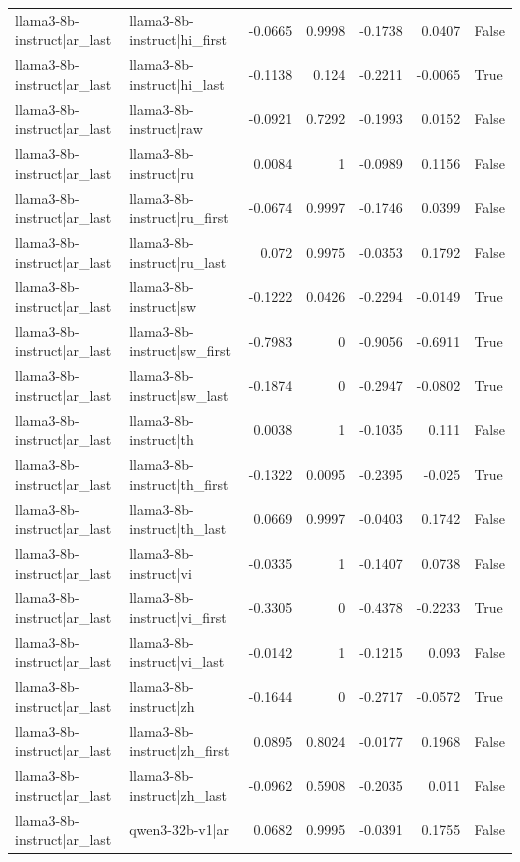 \begin{table}
\begin{tabular}{l l r r r r l}
llama3-8b-instruct|ar_last & llama3-8b-instruct|hi_first & -0.0665 & 0.9998 & -0.1738 & 0.0407 & False \\
llama3-8b-instruct|ar_last & llama3-8b-instruct|hi_last & -0.1138 & 0.124 & -0.2211 & -0.0065 & True \\
llama3-8b-instruct|ar_last & llama3-8b-instruct|raw & -0.0921 & 0.7292 & -0.1993 & 0.0152 & False \\
llama3-8b-instruct|ar_last & llama3-8b-instruct|ru & 0.0084 & 1 & -0.0989 & 0.1156 & False \\
llama3-8b-instruct|ar_last & llama3-8b-instruct|ru_first & -0.0674 & 0.9997 & -0.1746 & 0.0399 & False \\
llama3-8b-instruct|ar_last & llama3-8b-instruct|ru_last & 0.072 & 0.9975 & -0.0353 & 0.1792 & False \\
llama3-8b-instruct|ar_last & llama3-8b-instruct|sw & -0.1222 & 0.0426 & -0.2294 & -0.0149 & True \\
llama3-8b-instruct|ar_last & llama3-8b-instruct|sw_first & -0.7983 & 0 & -0.9056 & -0.6911 & True \\
llama3-8b-instruct|ar_last & llama3-8b-instruct|sw_last & -0.1874 & 0 & -0.2947 & -0.0802 & True \\
llama3-8b-instruct|ar_last & llama3-8b-instruct|th & 0.0038 & 1 & -0.1035 & 0.111 & False \\
llama3-8b-instruct|ar_last & llama3-8b-instruct|th_first & -0.1322 & 0.0095 & -0.2395 & -0.025 & True \\
llama3-8b-instruct|ar_last & llama3-8b-instruct|th_last & 0.0669 & 0.9997 & -0.0403 & 0.1742 & False \\
llama3-8b-instruct|ar_last & llama3-8b-instruct|vi & -0.0335 & 1 & -0.1407 & 0.0738 & False \\
llama3-8b-instruct|ar_last & llama3-8b-instruct|vi_first & -0.3305 & 0 & -0.4378 & -0.2233 & True \\
llama3-8b-instruct|ar_last & llama3-8b-instruct|vi_last & -0.0142 & 1 & -0.1215 & 0.093 & False \\
llama3-8b-instruct|ar_last & llama3-8b-instruct|zh & -0.1644 & 0 & -0.2717 & -0.0572 & True \\
llama3-8b-instruct|ar_last & llama3-8b-instruct|zh_first & 0.0895 & 0.8024 & -0.0177 & 0.1968 & False \\
llama3-8b-instruct|ar_last & llama3-8b-instruct|zh_last & -0.0962 & 0.5908 & -0.2035 & 0.011 & False \\
llama3-8b-instruct|ar_last & qwen3-32b-v1|ar & 0.0682 & 0.9995 & -0.0391 & 0.1755 & False \\

\end{tabular}
\end{table}
